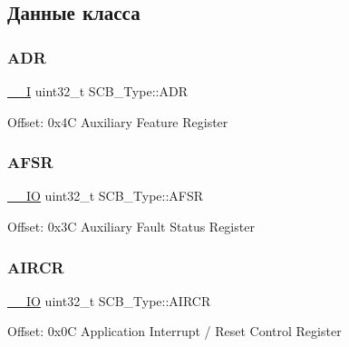 \subsection{Данные класса}
\mbox{\label{struct_s_c_b___type_aaedf846e435ed05c68784b40d3db2bf2}} 
\subsubsection{\texorpdfstring{ADR}{ADR}}
{\footnotesize\ttfamily \mbox{\hyperlink{group___c_m_s_i_s___c_m3__core__definitions_gaf63697ed9952cc71e1225efe205f6cd3}{\+\_\+\+\_\+I}} uint32\+\_\+t S\+C\+B\+\_\+\+Type\+::\+A\+DR}

Offset\+: 0x4C Auxiliary Feature Register ~\newline
 \mbox{\label{struct_s_c_b___type_aeb77053c84f49c261ab5b8374e8958ef}} 
\subsubsection{\texorpdfstring{AFSR}{AFSR}}
{\footnotesize\ttfamily \mbox{\hyperlink{group___c_m_s_i_s___c_m3__core__definitions_gaec43007d9998a0a0e01faede4133d6be}{\+\_\+\+\_\+\+IO}} uint32\+\_\+t S\+C\+B\+\_\+\+Type\+::\+A\+F\+SR}

Offset\+: 0x3C Auxiliary Fault Status Register ~\newline
 \mbox{\label{struct_s_c_b___type_a6ed3c9064013343ea9fd0a73a734f29d}} 
\subsubsection{\texorpdfstring{AIRCR}{AIRCR}}
{\footnotesize\ttfamily \mbox{\hyperlink{group___c_m_s_i_s___c_m3__core__definitions_gaec43007d9998a0a0e01faede4133d6be}{\+\_\+\+\_\+\+IO}} uint32\+\_\+t S\+C\+B\+\_\+\+Type\+::\+A\+I\+R\+CR}

Offset\+: 0x0C Application Interrupt / Reset Control Register ~\newline
 \mbox{\label{struct_s_c_b___type_a31f79afe86c949c9862e7d5fce077c3a}} 
